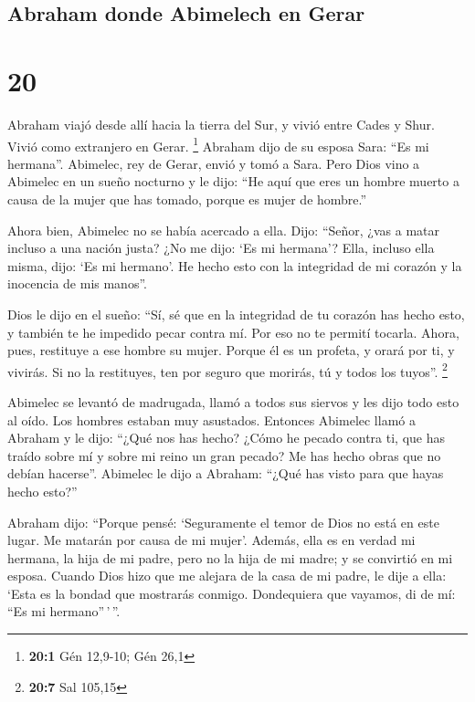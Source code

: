 \hypertarget{abraham-donde-abimelech-en-gerar}{%
\subsection{Abraham donde Abimelech en
Gerar}\label{abraham-donde-abimelech-en-gerar}}

\hypertarget{section-19}{%
\section{20}\label{section-19}}

 Abraham viajó desde allí hacia la tierra del Sur, y vivió
entre Cades y Shur. Vivió como extranjero en Gerar. \footnote{\textbf{20:1}
  Gén 12,9-10; Gén 26,1}  Abraham dijo de su esposa Sara:
``Es mi hermana''. Abimelec, rey de Gerar, envió y tomó a Sara.
 Pero Dios vino a Abimelec en un sueño nocturno y le dijo:
``He aquí que eres un hombre muerto a causa de la mujer que has tomado,
porque es mujer de hombre.''

 Ahora bien, Abimelec no se había acercado a ella. Dijo:
``Señor, ¿vas a matar incluso a una nación justa?  ¿No me
dijo: `Es mi hermana'? Ella, incluso ella misma, dijo: `Es mi hermano'.
He hecho esto con la integridad de mi corazón y la inocencia de mis
manos''.

 Dios le dijo en el sueño: ``Sí, sé que en la integridad
de tu corazón has hecho esto, y también te he impedido pecar contra mí.
Por eso no te permití tocarla.  Ahora, pues, restituye a
ese hombre su mujer. Porque él es un profeta, y orará por ti, y vivirás.
Si no la restituyes, ten por seguro que morirás, tú y todos los tuyos''.
\footnote{\textbf{20:7} Sal 105,15}

 Abimelec se levantó de madrugada, llamó a todos sus
siervos y les dijo todo esto al oído. Los hombres estaban muy asustados.
 Entonces Abimelec llamó a Abraham y le dijo: ``¿Qué nos
has hecho? ¿Cómo he pecado contra ti, que has traído sobre mí y sobre mi
reino un gran pecado? Me has hecho obras que no debían hacerse''.
 Abimelec le dijo a Abraham: ``¿Qué has visto para que
hayas hecho esto?''

 Abraham dijo: ``Porque pensé: `Seguramente el temor de
Dios no está en este lugar. Me matarán por causa de mi mujer'.
 Además, ella es en verdad mi hermana, la hija de mi
padre, pero no la hija de mi madre; y se convirtió en mi esposa.
 Cuando Dios hizo que me alejara de la casa de mi padre,
le dije a ella: `Esta es la bondad que mostrarás conmigo. Dondequiera
que vayamos, di de mí: ``Es mi hermano''\,'\,''.


